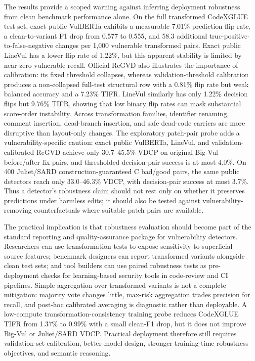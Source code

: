\documentclass[a4paper,fleqn]{cas-dc}
\begin{document}
The results provide a scoped warning against inferring deployment robustness
from clean benchmark performance alone. On the full transformed CodeXGLUE test
set, exact public VulBERTa exhibits a measurable 7.01\% prediction flip rate,
a clean-to-variant F1 drop from 0.577 to 0.555, and 58.3 additional
true-positive-to-false-negative changes per 1,000 vulnerable transformed
pairs. Exact public LineVul has a lower flip rate
of 1.22\%, but this apparent stability is limited by near-zero vulnerable
recall. Official ReGVD also illustrates the importance of calibration: its
fixed threshold collapses, whereas validation-threshold calibration produces a
non-collapsed full-test structural row with a 0.81\% flip rate but weak
balanced accuracy and a 7.23\% TIFR. LineVul similarly has only 1.22\%
decision flips but 9.76\% TIFR, showing that low binary flip rates can mask
substantial score-order instability. Across
transformation families, identifier renaming, comment insertion, dead-branch
insertion, and safe dead-code carriers are more disruptive than layout-only
changes.
The exploratory patch-pair probe adds a vulnerability-specific caution:
exact public VulBERTa, LineVul, and validation-calibrated ReGVD achieve only
30.7--45.5\% VDCP on original Big-Vul before/after fix pairs, and thresholded
decision-pair success is at most 4.0\%. On 400 Juliet/SARD construction-guaranteed
C bad/good pairs, the same public detectors reach only 33.0--46.3\% VDCP, with
decision-pair success at most 3.7\%. Thus a detector's robustness claim should
not rest only on whether it preserves predictions under harmless edits; it
should also be tested against vulnerability-removing counterfactuals where
suitable patch pairs are available.

The practical implication is that robustness evaluation should become part of
the standard reporting and quality-assurance package for vulnerability
detectors. Researchers can use transformation tests to expose sensitivity to
superficial source features; benchmark designers can report transformed
variants alongside clean test sets; and tool builders can use paired
robustness tests as pre-deployment checks for learning-based security tools in
code-review and CI pipelines. Simple aggregation over transformed variants is
not a complete mitigation: majority vote changes little, max-risk aggregation
trades precision for recall, and post-hoc calibrated averaging is diagnostic
rather than deployable. A low-compute transformation-consistency training probe
reduces CodeXGLUE TIFR from 1.37\% to 0.99\% with a small clean-F1 drop, but it
does not improve Big-Vul or Juliet/SARD VDCP. Practical deployment therefore
still requires validation-set calibration, better model design, stronger
training-time robustness objectives, and semantic reasoning.
\end{document}

